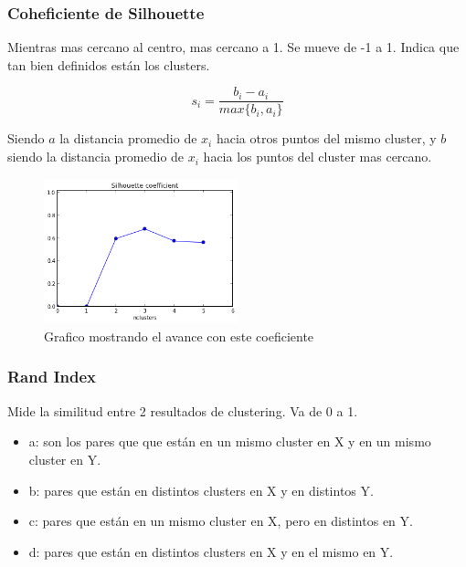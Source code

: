 \documentclass[titlepage,a4paper]{article}
\begin{document}
\subsubsection{Coheficiente de Silhouette}
Mientras mas cercano al centro, mas cercano a 1. Se mueve de -1 a 1. Indica que tan bien definidos están los clusters.

\begin{equation}
    s_i = \frac{b_i - a_i}{max\{b_i,a_i\}}
\end{equation}

Siendo $a$ la distancia promedio de $x_i$ hacia otros puntos del mismo cluster, y $b$ siendo la distancia promedio de $x_i$ hacia los puntos del cluster mas cercano.

\begin{figure}[!htb]
    \centering
    \includegraphics[width=0.5\textwidth]{imagenesResumen/SilhouetteCoef.png}
    \caption{Grafico mostrando el avance con este coeficiente}
\end{figure}

\newpage

\subsubsection{Rand Index}

Mide la similitud entre 2 resultados de clustering. Va de 0 a 1.

\begin{itemize}
    \item a: son los pares que que están en un mismo cluster en X y en un mismo cluster en Y.
    \item b: pares que están en distintos clusters en X y en distintos Y.
    \item c: pares que están en un mismo cluster en X, pero en distintos en Y.
    \item d: pares que están en distintos clusters en X y en el mismo en Y.
\end{itemize}
\end{document}

